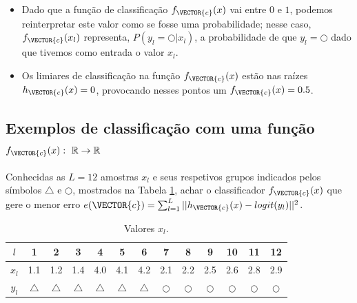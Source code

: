 \begin{tcbattention}
\begin{itemize}
\item Dado que a função de classificação $f_{\VECTOR{c}}(x)$ vai entre $0$ e $1$,
podemos reinterpretar este valor como se fosse uma probabilidade;
nesse caso, $f_{\VECTOR{c}}(x_l)$ representa, $P(y_l=\bigcirc|x_l)$, 
a probabilidade de que $y_l=\bigcirc$ dado que tivemos como entrada o valor $x_l$.
\item Os limiares de classificação na função $f_{\VECTOR{c}}(x)$ estão nas raízes $h_{\VECTOR{c}}(x)=0$,
provocando nesses pontos um $f_{\VECTOR{c}}(x)=0.5$.
\end{itemize}
\end{tcbattention}



\subsection{Exemplos de classificação com uma função
$f_{\VECTOR{c}}(x):~\mathbb{R} \rightarrow \mathbb{R}$ }

\begin{example}\label{ex:theo:reglogr1r1poly}
Conhecidas as $L=12$ amostras $x_l$ e seus respetivos grupos indicados pelos símbolos $\bigtriangleup$ e $\bigcirc$, 
mostrados na Tabela \ref{table:theo:reglogr1r1poly:xn},
achar o classificador $f_{\VECTOR{c}}(x)$ 
que gere o menor erro $e(\VECTOR{c}) =   \sum_{l=1}^{L} ||h_{\VECTOR{c}}(x)-logit(y_l)||^2$.
\end{example}


\begin{table}[h!]
\centering
\begin{tabular}{|c||c|c|c|c|c|c||c|c|c|c|c|c|} 
 \hline
$l$   & 1 & 2 & 3 & 4 & 5 & 6 & 7 & 8 & 9 & 10 & 11 & 12\\ \hline \hline
$x_l$ & 1.1 & 1.2 & 1.4 & 4.0 & 4.1 & 4.2 & 2.1 & 2.2 & 2.5 & 2.6 & 2.8 & 2.9 \\ \hline
$y_l$ & $\bigtriangleup$ & $\bigtriangleup$ & $\bigtriangleup$ & $\bigtriangleup$ & $\bigtriangleup$ & $\bigtriangleup$
      & $\bigcirc$ & $\bigcirc$ & $\bigcirc$ & $\bigcirc$ & $\bigcirc$ & $\bigcirc$ \\ \hline
\end{tabular}
\caption{Valores $x_l$.}
\label{table:theo:reglogr1r1poly:xn}
\end{table}


